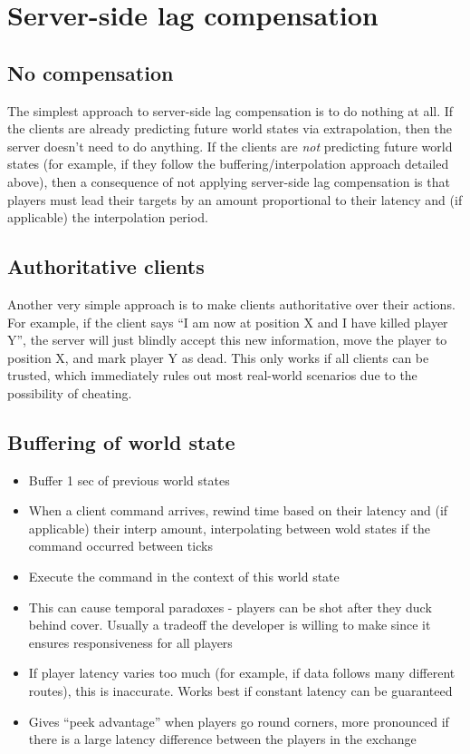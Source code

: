 \documentclass[conference]{IEEEtran}
\begin{document}
	\section{Server-side lag compensation}

	\subsection{No compensation}

	The simplest approach to server-side lag compensation is to do nothing at all. If the clients are already predicting future world states via extrapolation, then the server doesn't need to do anything. If the clients are \emph{not} predicting future world states (for example, if they follow the buffering/interpolation approach detailed above), then a consequence of not applying server-side lag compensation is that players must lead their targets by an amount proportional to their latency and (if applicable) the interpolation period.

	\subsection{Authoritative clients}

	Another very simple approach is to make clients authoritative over their actions. For example, if the client says ``I am now at position X and I have killed player Y'', the server will just blindly accept this new information, move the player to position X, and mark player Y as dead. This only works if all clients can be trusted, which immediately rules out most real-world scenarios due to the possibility of cheating.

	\subsection{Buffering of world state}

	\cite{bernier2001latency}

	\begin{itemize}
		\item Buffer 1 sec of previous world states
		\item When a client command arrives, rewind time based on their latency and (if applicable) their interp amount, interpolating between wold states if the command occurred between ticks
		\item Execute the command in the context of this world state
		\item This can cause temporal paradoxes - players can be shot after they duck behind cover. Usually a tradeoff the developer is willing to make since it ensures responsiveness for all players
		\item If player latency varies too much (for example, if data follows many different routes), this is inaccurate. Works best if constant latency can be guaranteed
		\item Gives ``peek advantage'' when players go round corners, more pronounced if there is a large latency difference between the players in the exchange
	\end{itemize}
\end{document}
